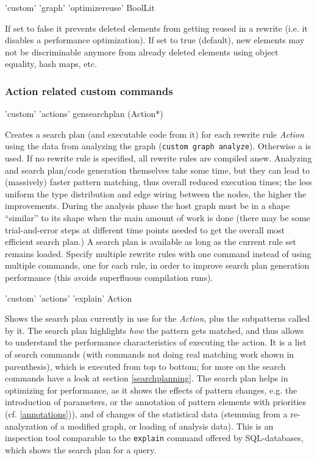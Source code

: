 \begin{rail}
  'custom' 'graph' 'optimizereuse' BoolLit
\end{rail}
If set to false it prevents deleted elements from getting reused in a rewrite (i.e. it disables a performance optimization).
If set to true (default), new elements may not be discriminable anymore from already deleted elements using object equality, hash maps, etc.

\subsubsection*{Action related custom commands}

\begin{rail}
  'custom' 'actions' gensearchplan (Action*)
\end{rail}
Creates a search plan (and executable code from it) for each rewrite rule \emph{Action} using the data from analyzing the graph (\texttt{custom graph analyze}).
Otherwise a  is used.
If no rewrite rule is specified, all rewrite rules are compiled anew.
Analyzing and search plan/code generation themselves take some time, but they can lead to (massively) faster pattern matching, thus overall reduced execution times;
the less uniform the type distribution and edge wiring between the nodes, the higher the improvements.
During the analysis phase the host graph must be in a shape ``similar'' to its shape when the main amount of work is done
(there may be some trial-and-error steps at different time points needed to get the overall most efficient search plan.)
A search plan is available as long as the current rule set remains loaded.
Specify multiple rewrite rules with one command instead of using multiple commands, one for each rule, in order to improve search plan generation performance (this avoids superfluous compilation runs).

\begin{rail}
  'custom' 'actions' 'explain' Action
\end{rail}
Shows the search plan currently in use for the \emph{Action}, plus the subpatterns called by it.
The search plan highlights \emph{how} the pattern gets matched, and thus allows to understand the performance characteristics of executing the action.
It is a list of search commands (with commands not doing real matching work shown in parenthesis), which is executed from top to bottom; for more on the search commands have a look at section \ref{searchplanning}.
The search plan helps in optimizing for performance, as it shows the effects of pattern changes, e.g. the introduction of parameters, or the annotation of pattern elements with priorities (cf. \ref{annotations})), and of changes of the statistical data (stemming from a re-analyzation of a modified graph, or loading of analysis data).
This is an inspection tool comparable to the \texttt{explain} command offered by SQL-databases, which shows the search plan for a query.


